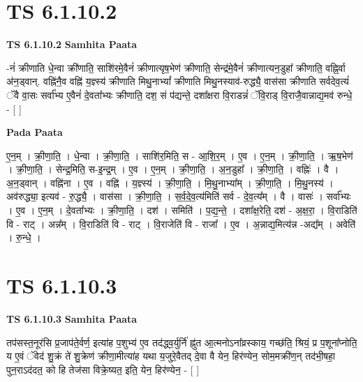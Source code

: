 \documentclass[17pt]{extarticle}
\begin{document}

\section{ TS 6.1.10.2 }

\textbf{TS 6.1.10.2 } \newline
\textbf{Samhita Paata} \newline

-नं॑ क्रीणाति धे॒न्वा क्री॑णाति॒ साशि॑रमे॒वैनं॑ क्रीणात्यृष॒भेण॑ क्रीणाति॒ सेन्द्र॑मे॒वैनं॑ क्रीणात्यन॒डुहा᳚ क्रीणाति॒ वह्नि॒र्वा अ॑न॒ड्वान्. वह्नि॑नै॒व वह्नि॑ य॒ज्ञ्स्य॑ क्रीणाति मिथु॒नाभ्यां᳚ क्रीणाति मिथु॒नस्याव॑-रुद्ध्यै॒ वास॑सा क्रीणाति सर्वदेव॒त्यं॑ ॅवै वा॒सः सर्वा᳚भ्य ए॒वैनं॑ दे॒वता᳚भ्यः क्रीणाति॒ दश॒ सं प॑द्यन्ते॒ दशा᳚क्षरा वि॒राडन्नं॑ ॅवि॒राड् वि॒राजै॒वान्नाद्य॒मव॑ रुन्धे॒ - [  ] \newline

\textbf{Pada Paata} \newline

ए॒न॒म् । क्री॒णा॒ति॒ । धे॒न्वा । क्री॒णा॒ति॒ । साशि॑र॒मिति॒ स - आ॒शि॒र॒म् । ए॒व । ए॒न॒म् । क्री॒णा॒ति॒ । ऋ॒ष॒भेण॑ । क्री॒णा॒ति॒ । सेन्द्र॒मिति॒ स-इ॒न्द्र॒म् । ए॒व । ए॒न॒म् । क्री॒णा॒ति॒ । अ॒न॒डुहा᳚ । क्री॒णा॒ति॒ । वह्निः॑ । वै । अ॒न॒ड्वान् । वह्नि॑ना । ए॒व । वह्नि॑ । य॒ज्ञ्स्य॑ । क्री॒णा॒ति॒ । मि॒थु॒नाभ्या᳚म् । क्री॒णा॒ति॒ । मि॒थु॒नस्य॑ । अव॑रुद्ध्या॒ इत्यव॑ - रु॒द्ध्यै॒ । वास॑सा । क्री॒णा॒ति॒ । स॒र्व॒दे॒व॒त्य॑मिति॑ सर्व - दे॒व॒त्य᳚म् । वै । वासः॑ । सर्वा᳚भ्यः । ए॒व । ए॒न॒म् । दे॒वता᳚भ्यः । क्री॒णा॒ति॒ । दश॑ । समिति॑ । प॒द्य॒न्ते॒ । दशा᳚क्ष॒रेति॒ दश॑ - अ॒क्ष॒रा॒ । वि॒राडिति॑ वि - राट् । अन्न᳚म् । वि॒राडिति॑ वि - राट् । वि॒राजेति॑ वि - राजा᳚ । ए॒व । अ॒न्नाद्य॒मित्य॑न्न -अद्य᳚म् । अवेति॑ । रु॒न्धे॒ ।  \newline





\section{ TS 6.1.10.3 }

\textbf{TS 6.1.10.3 } \newline
\textbf{Samhita Paata} \newline

तप॑सस्त॒नूर॑सि प्र॒जाप॑ते॒र्वर्ण॒ इत्या॑ह प॒शुभ्य॑ ए॒व तद॑द्ध्व॒र्युर्नि॑ ह्नु॑त आ॒त्मनोऽना᳚व्रस्काय॒ गच्छ॑ति॒ श्रियं॒ प्र प॒शूना᳚प्नोति॒ य ए॒वं ॅवेद॑ शु॒क्रं ते॑ शु॒क्रेण॑ क्रीणा॒मीत्या॑ह यथा य॒जुरे॒वैतद् दे॒वा वै येन॒ हिर॑ण्येन॒ सोम॒मक्री॑ण॒न् तद॑भी॒षहा॒ पुन॒राऽद॑दत॒ को हि तेज॑सा विक्रे॒ष्यत॒ इति॒ येन॒ हिर॑ण्येन॒ - [  ] \newline
\end{document}
